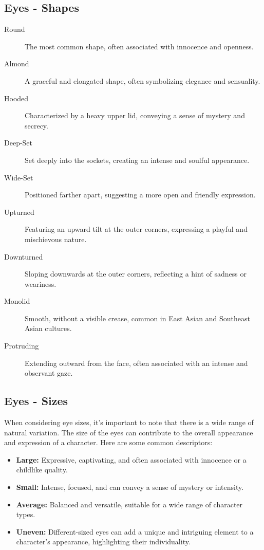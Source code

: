 \documentclass[12pt]{book}
\begin{document}
\subsection{\textbf{Eyes - Shapes}}

\begin{description}
    \item[Round] The most common shape, often associated with innocence and openness.
    \item[Almond] A graceful and elongated shape, often symbolizing elegance and sensuality.
    \item[Hooded] Characterized by a heavy upper lid, conveying a sense of mystery and secrecy.
    \item[Deep-Set] Set deeply into the sockets, creating an intense and soulful appearance.
    \item[Wide-Set] Positioned farther apart, suggesting a more open and friendly expression.
    \item[Upturned] Featuring an upward tilt at the outer corners, expressing a playful and mischievous nature.
    \item[Downturned] Sloping downwards at the outer corners, reflecting a hint of sadness or weariness.
    \item[Monolid] Smooth, without a visible crease, common in East Asian and Southeast Asian cultures.
    \item[Protruding] Extending outward from the face, often associated with an intense and observant gaze.
\end{description}

\subsection{\textbf{Eyes - Sizes}}

When considering eye sizes, it's important to note that there is a wide range of natural variation. The size of the eyes can contribute to the overall appearance and expression of a character. Here are some common descriptors:

\begin{itemize}
    \item \textbf{Large:} Expressive, captivating, and often associated with innocence or a childlike quality.
    \item \textbf{Small:} Intense, focused, and can convey a sense of mystery or intensity.
    \item \textbf{Average:} Balanced and versatile, suitable for a wide range of character types.
    \item \textbf{Uneven:} Different-sized eyes can add a unique and intriguing element to a character's appearance, highlighting their individuality.
\end{itemize}
\end{document}
